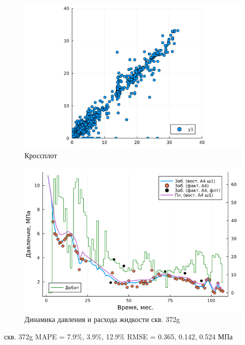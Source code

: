 \documentclass[14pt]{article}
\begin{document}
\begin{figure}[!htb]
	\centering
	\includegraphics[width=1.0\linewidth]{pic/cp_A2}
	\caption{Кроссплот}
	\label{fig:CP_A4}
\end{figure}

\begin{figure}[!htb]
	\centering
	\includegraphics[width=1.0\linewidth]{pic/pw_372g(13)_a4}
	\caption{Динамика давления и расхода жидкости скв. 372g}
	\label{fig:RMSE_A4_w1}
\end{figure}

скв. 372g
MAPE = 7.9\%, 3.9\%, 12.9\%
RMSE = 0.365, 0.142, 0.524 МПа
\end{document}

